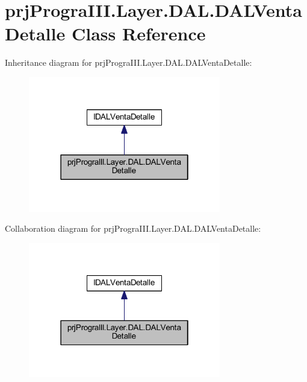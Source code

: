 \hypertarget{classprj_progra_i_i_i_1_1_layer_1_1_d_a_l_1_1_d_a_l_venta_detalle}{}\section{prj\+Progra\+I\+I\+I.\+Layer.\+D\+A\+L.\+D\+A\+L\+Venta\+Detalle Class Reference}
\label{classprj_progra_i_i_i_1_1_layer_1_1_d_a_l_1_1_d_a_l_venta_detalle}


Inheritance diagram for prj\+Progra\+I\+I\+I.\+Layer.\+D\+A\+L.\+D\+A\+L\+Venta\+Detalle\+:
\nopagebreak
\begin{figure}[H]
\begin{center}
\leavevmode
\includegraphics[width=238pt]{classprj_progra_i_i_i_1_1_layer_1_1_d_a_l_1_1_d_a_l_venta_detalle__inherit__graph}
\end{center}
\end{figure}


Collaboration diagram for prj\+Progra\+I\+I\+I.\+Layer.\+D\+A\+L.\+D\+A\+L\+Venta\+Detalle\+:
\nopagebreak
\begin{figure}[H]
\begin{center}
\leavevmode
\includegraphics[width=238pt]{classprj_progra_i_i_i_1_1_layer_1_1_d_a_l_1_1_d_a_l_venta_detalle__coll__graph}
\end{center}
\end{figure}
